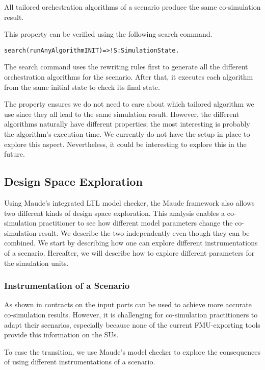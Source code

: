 \begin{lemma}
  All tailored orchestration algorithms of a scenario produce the same co-simulation result.
\end{lemma}

This property can be verified using the following search command.

\begin{alltt}
  search (runAnyAlgorithm INIT)  =>! S:SimulationState . 
\end{alltt}
The search command uses the rewriting rules first to generate all the different orchestration algorithms for the scenario.
After that, it executes each algorithm from the same initial state to check its final state.

The property ensures we do not need to care about which tailored algorithm we use since they all lead to the same simulation result.
However, the different algorithms naturally have different properties; the most interesting is probably the algorithm's execution time. 
We currently do not have the setup in place to explore this aspect.
Nevertheless, it could be interesting to explore this in the future.


\subsection{Design Space Exploration}
Using Maude's integrated LTL model checker, the Maude framework also allows two different kinds of design space exploration.
This analysis enables a co-simulation practitioner to see how different model parameters change the co-simulation result.
We describe the two independently even though they can be combined.
We start by describing how one can explore different instrumentations of a scenario.
Hereafter, we will describe how to explore different parameters for the simulation units.  

\subsubsection{Instrumentation of a Scenario}
As shown in \cite{Gomes2019,Oakes2021,hansen_verification_2021} contracts on the input ports can be used to achieve more accurate co-simulation results.
However, it is challenging for co-simulation practitioners to adapt their scenarios, especially because none of the current FMU-exporting tools provide this information on the SUs.

To ease the transition, we use Maude's model checker to explore the consequences of using different instrumentations of a scenario.

